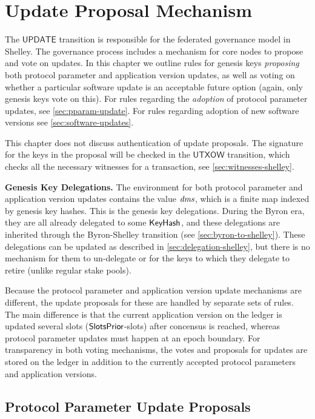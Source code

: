 \section{Update Proposal Mechanism}
\label{sec:update}


The $\mathsf{UPDATE}$ transition is responsible for the federated governance model in Shelley.
The governance process includes a mechanism for core nodes to propose and vote on
updates. In this chapter we
outline rules for genesis keys \textit{proposing} both protocol parameter
and application version updates, as well as voting on whether a particular
software update is an acceptable future option (again, only genesis keys vote on this).
For rules regarding the \textit{adoption} of protocol
parameter updates, see \ref{sec:pparam-update}. For rules regarding
adoption of new software versions see \ref{sec:software-updates}.

This chapter does not discuss authentication of update proposals.
The signature for the keys in the proposal will be checked in the
$\mathsf{UTXOW}$ transition, which checks all the necessary witnesses
for a transaction, see \ref{sec:witnesses-shelley}.

\textbf{Genesis Key Delegations.} The environment for both protocol parameter
and application version updates contains
the value $\mathit{dms}$, which is a finite map indexed by genesis key hashes.
This is the genesis key delegations. During the Byron era, they are all
already delegated to some $\mathsf{KeyHash}$, and these delegations are inherited
through the Byron-Shelley transition (see \ref{sec:byron-to-shelley}).
These delegations can be updated as described in \ref{sec:delegation-shelley},
but there is no mechanism for them to un-delegate or for the keys to which they delegate
to retire (unlike regular stake pools).

Because the protocol parameter and application version update mechanisms are different, the
update proposals for these are handled by separate sets of rules. The main
difference is that the current application version on the ledger is updated
several slots ($\mathsf{SlotsPrior}$-slots) after concensus is reached, whereas protocol
parameter updates must happen at an epoch boundary.
For transparency in both voting mechanisms, the votes and proposals for updates
are stored
on the ledger in addition to the currently accepted protocol parameters and
application versions.

\subsection{Protocol Parameter Update Proposals}
\label{sec:pp-proposals}

